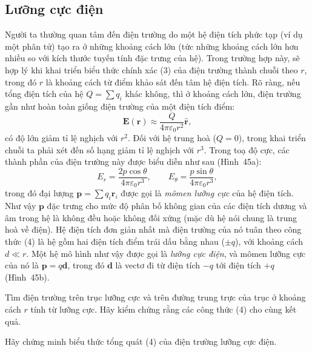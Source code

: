 \subsection{Lưỡng cực điện}

Người ta thường quan tâm đến điện trường do một hệ điện tích phức tạp (ví dụ một phân tử) tạo ra ở những khoảng cách lớn (tức những khoảng cách lớn hơn nhiều so với kích thước tuyến tính đặc trưng của hệ). Trong trường hợp này, sẽ hợp lý khi khai triển biểu thức chính xác (3) của điện trường thành chuỗi theo $r$, trong đó $r$ là khoảng cách từ điểm khảo sát đến tâm hệ điện tích. Rõ ràng, nếu tổng điện tích của hệ $Q=\sum q_i$ khác không, thì ở khoảng cách lớn, điện trường gần như hoàn toàn giống điện trường của một điện tích điểm:
\[
\mathbf{E}(\mathbf{r}) \approx \frac{Q}{4\pi\varepsilon_0 r^2}\hat{\mathbf{r}},
\]
có độ lớn giảm tỉ lệ nghịch với $r^2$. Đối với hệ trung hoà ($Q=0$), trong khai triển chuỗi ta phải xét đến số hạng giảm tỉ lệ nghịch với $r^3$. Trong toạ độ cực, các thành phần của điện trường này được biểu diễn như sau (Hình~45a):
\[
E_r = \frac{2p\cos\theta}{4\pi\varepsilon_0 r^3}, \qquad E_\theta = \frac{p\sin\theta}{4\pi\varepsilon_0 r^3}, \tag{4}
\]
trong đó đại lượng $\mathbf{p}=\sum q_i \mathbf{r}_i$ được gọi là \emph{mômen lưỡng cực} của hệ điện tích. Như vậy $\mathbf{p}$ đặc trưng cho mức độ phân bố không gian của các điện tích dương và âm trong hệ là không đều hoặc không đối xứng (mặc dù hệ nói chung là trung hoà về điện). Hệ điện tích đơn giản nhất mà điện trường của nó tuân theo công thức (4) là hệ gồm hai điện tích điểm trái dấu bằng nhau ($\pm q$), với khoảng cách $d \ll r$. Một hệ mô hình như vậy được gọi là \emph{lưỡng cực điện}, và mômen lưỡng cực của nó là $\mathbf{p}=q\mathbf{d}$, trong đó $\mathbf{d}$ là vectơ đi từ điện tích $-q$ tới điện tích $+q$ (Hình~45b).

 Tìm điện trường trên trục lưỡng cực và trên đường trung trực của trục ở khoảng cách $r$ tính từ lưỡng cực. Hãy kiểm chứng rằng các công thức (4) cho cùng kết quả.


 Hãy chứng minh biểu thức tổng quát (4) của điện trường lưỡng cực điện. 

